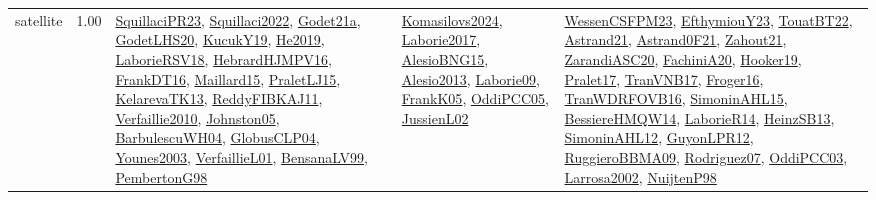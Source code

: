 {\begin{longtable}{p{3cm}r>{\raggedright\arraybackslash}p{6cm}>{\raggedright\arraybackslash}p{6cm}>{\raggedright\arraybackslash}p{8cm}}
\index{satellite}\index{ApplicationAreas!satellite}satellite &  1.00 & \hyperref[detail:SquillaciPR23]{SquillaciPR23}, \hyperref[detail:Squillaci2022]{Squillaci2022}, \hyperref[detail:Godet21a]{Godet21a}, \hyperref[detail:GodetLHS20]{GodetLHS20}, \hyperref[detail:KucukY19]{KucukY19}, \hyperref[detail:He2019]{He2019}, \hyperref[detail:LaborieRSV18]{LaborieRSV18}, \hyperref[detail:HebrardHJMPV16]{HebrardHJMPV16}, \hyperref[detail:FrankDT16]{FrankDT16}, \hyperref[detail:Maillard15]{Maillard15}, \hyperref[detail:PraletLJ15]{PraletLJ15}, \hyperref[detail:KelarevaTK13]{KelarevaTK13}, \hyperref[detail:ReddyFIBKAJ11]{ReddyFIBKAJ11}, \hyperref[detail:Verfaillie2010]{Verfaillie2010}, \hyperref[detail:Johnston05]{Johnston05}, \hyperref[detail:BarbulescuWH04]{BarbulescuWH04}, \hyperref[detail:GlobusCLP04]{GlobusCLP04}, \hyperref[detail:Younes2003]{Younes2003}, \hyperref[detail:VerfaillieL01]{VerfaillieL01}, \hyperref[detail:BensanaLV99]{BensanaLV99}, \hyperref[detail:PembertonG98]{PembertonG98} & \hyperref[detail:Komasilovs2024]{Komasilovs2024}, \hyperref[detail:Laborie2017]{Laborie2017}, \hyperref[detail:AlesioBNG15]{AlesioBNG15}, \hyperref[detail:Alesio2013]{Alesio2013}, \hyperref[detail:Laborie09]{Laborie09}, \hyperref[detail:FrankK05]{FrankK05}, \hyperref[detail:OddiPCC05]{OddiPCC05}, \hyperref[detail:JussienL02]{JussienL02} & \hyperref[detail:WessenCSFPM23]{WessenCSFPM23}, \hyperref[detail:EfthymiouY23]{EfthymiouY23}, \hyperref[detail:TouatBT22]{TouatBT22}, \hyperref[detail:Astrand21]{Astrand21}, \hyperref[detail:Astrand0F21]{Astrand0F21}, \hyperref[detail:Zahout21]{Zahout21}, \hyperref[detail:ZarandiASC20]{ZarandiASC20}, \hyperref[detail:FachiniA20]{FachiniA20}, \hyperref[detail:Hooker19]{Hooker19}, \hyperref[detail:Pralet17]{Pralet17}, \hyperref[detail:TranVNB17]{TranVNB17}, \hyperref[detail:Froger16]{Froger16}, \hyperref[detail:TranWDRFOVB16]{TranWDRFOVB16}, \hyperref[detail:SimoninAHL15]{SimoninAHL15}, \hyperref[detail:BessiereHMQW14]{BessiereHMQW14}, \hyperref[detail:LaborieR14]{LaborieR14}, \hyperref[detail:HeinzSB13]{HeinzSB13}, \hyperref[detail:SimoninAHL12]{SimoninAHL12}, \hyperref[detail:GuyonLPR12]{GuyonLPR12}, \hyperref[detail:RuggieroBBMA09]{RuggieroBBMA09}, \hyperref[detail:Rodriguez07]{Rodriguez07}, \hyperref[detail:OddiPCC03]{OddiPCC03}, \hyperref[detail:Larrosa2002]{Larrosa2002}, \hyperref[detail:NuijtenP98]{NuijtenP98}\\

\end{longtable}}
